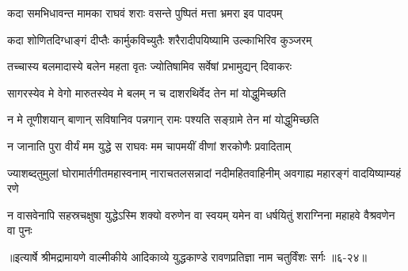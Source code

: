 \twolineshloka
{कदा समभिधावन्त मामका राघवं शराः}
{वसन्ते पुष्पितं मत्ता भ्रमरा इव पादपम्} %

\twolineshloka
{कदा शोणितदिग्धाङ्गं दीप्तैः कार्मुकविच्युतैः}
{शरैरादीपयिष्यामि उल्काभिरिव कुञ्जरम्} %

\twolineshloka
{तच्चास्य बलमादास्ये बलेन महता वृतः}
{ज्योतिषामिव सर्वेषां प्रभामुद्यन् दिवाकरः} %

\twolineshloka
{सागरस्येव मे वेगो मारुतस्येव मे बलम्}
{न च दाशरथिर्वेद तेन मां योद्धुमिच्छति} %

\twolineshloka
{न मे तूणीशयान् बाणान् सविषानिव पन्नगान्}
{रामः पश्यति सङ्ग्रामे तेन मां योद्धुमिच्छति} %

\twolineshloka
{न जानाति पुरा वीर्यं मम युद्धे स राघवः}
{मम चापमयीं वीणां शरकोणैः प्रवादिताम्} %

\threelineshloka
{ज्याशब्दतुमुलां घोरामार्तगीतमहास्वनाम्}
{नाराचतलसन्नादां नदीमहितवाहिनीम्}
{अवगाह्य महारङ्गं वादयिष्याम्यहं रणे} %

\twolineshloka
{न वासवेनापि सहस्रचक्षुषा युद्धेऽस्मि शक्यो वरुणेन वा स्वयम्}
{यमेन वा धर्षयितुं शराग्निना महाहवे वैश्रवणेन वा पुनः} %


॥इत्यार्षे श्रीमद्रामायणे वाल्मीकीये आदिकाव्ये युद्धकाण्डे रावणप्रतिज्ञा नाम चतुर्विंशः सर्गः ॥६-२४॥
